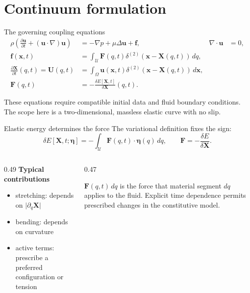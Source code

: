 \documentclass[aspectratio=169,11pt]{beamer}
\newcommand{\uvec}{\bm{u}}
\newcommand{\xvec}{\bm{x}}
\newcommand{\Xvec}{\bm{X}}
\newcommand{\Uvec}{\bm{U}}
\newcommand{\fvec}{\bm{f}}
\newcommand{\Fvec}{\bm{F}}
\newcommand{\etavec}{\bm{\eta}}
\begin{document}
\section{Continuum formulation}

\begin{frame}{The governing coupling equations}
\small
\begin{align*}
\rho\left(\frac{\partial\uvec}{\partial t}+(\uvec\cdot\nabla)\uvec\right)
  &= -\nabla p+\mu\Delta\uvec+\fvec,
  & \nabla\cdot\uvec&=0,\\[2pt]
\fvec(\xvec,t)
  &=\int_{\mathcal U}\Fvec(q,t)
  \delta^{(2)}\!\left(\xvec-\Xvec(q,t)\right)\,dq,\\[2pt]
\frac{\partial\Xvec}{\partial t}(q,t)=\Uvec(q,t)
  &=\int_{\Omega}\uvec(\xvec,t)
  \delta^{(2)}\!\left(\xvec-\Xvec(q,t)\right)\,d\xvec,\\[2pt]
\Fvec(q,t)&=-\frac{\delta E[\Xvec,t]}{\delta\Xvec}(q,t).
\end{align*}
\begin{punchbox}
\centering
These equations require compatible initial data and fluid boundary conditions. The scope here is a two-dimensional, massless elastic curve with no slip.
\end{punchbox}
\vspace{3pt}
\end{frame}

\begin{frame}{Elastic energy determines the force}
The variational definition fixes the sign:
\[
  \delta E[\Xvec,t;\etavec]
  =
  -\int_{\mathcal U}\Fvec(q,t)\cdot\etavec(q)\,dq,
  \qquad
  \boxed{\Fvec=-\frac{\delta E}{\delta\Xvec}}.
\]
\begin{columns}[T,onlytextwidth]
\begin{column}{0.49\textwidth}
\textbf{Typical contributions}
\begin{itemize}\itemsep6pt
  \item stretching: depends on \(\lvert\partial_q\Xvec\rvert\)
  \item bending: depends on curvature
  \item active terms: prescribe a preferred configuration or tension
\end{itemize}
\end{column}
\begin{column}{0.47\textwidth}
\begin{punchbox}
\small \(\Fvec(q,t)\,dq\) is the force that material segment \(dq\) applies to the fluid. Explicit time dependence permits prescribed changes in the constitutive model.
\end{punchbox}
\end{column}
\end{columns}
\end{frame}
\end{document}
